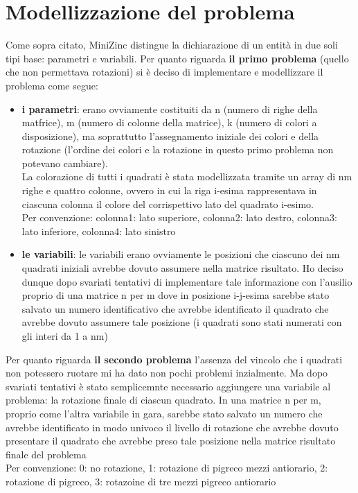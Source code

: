 \documentclass{article}
\begin{document}
\section{Modellizzazione del problema}
Come sopra citato, MiniZinc distingue la dichiarazione di un entità in due soli tipi base: parametri e variabili.
Per quanto riguarda \textbf{il primo problema} (quello che non permettava rotazioni) si è deciso di implementare e modellizzare il problema come segue:
\begin{itemize}
\item \textbf{i parametri}: erano ovviamente costituiti da n (numero di righe della matfrice), m (numero di colonne della matrice), k (numero di colori a disposizione), ma soprattutto l'assegnamento iniziale dei colori e della rotazione (l'ordine dei colori e la rotazione in questo primo problema non potevano cambiare).\\
La colorazione di tutti i quadrati è stata modellizzata tramite un array di nm righe e quattro colonne, ovvero in cui la riga i-esima rappresentava in ciascuna colonna il colore del corrispettivo lato del quadrato i-esimo.\\
Per convenzione: colonna1: lato superiore, colonna2: lato destro, colonna3: lato inferiore, colonna4: lato sinistro
\item \textbf{le variabili}: le variabili erano ovviamente le posizioni che ciascuno dei nm quadrati iniziali avrebbe dovuto assumere nella matrice risultato. Ho deciso dunque dopo svariati tentativi di implementare tale informazione con l'ausilio proprio di una matrice n per m dove in posizione i-j-esima sarebbe stato salvato un numero identificativo che avrebbe identificato il quadrato che avrebbe dovuto assumere tale posizione (i quadrati sono stati numerati con gli interi da 1 a nm)
\end{itemize}
Per quanto riguarda \textbf{il secondo problema} l'assenza del vincolo che i quadrati non potessero ruotare mi ha dato non pochi problemi inzialmente. Ma dopo svariati tentativi è stato semplicemnte necessario aggiungere una variabile al problema: la rotazione finale di ciascun quadrato. In una matrice n per m, proprio come l'altra variabile in gara, sarebbe stato salvato un numero che avrebbe identificato in modo univoco il livello di rotazione che avrebbe dovuto presentare il quadrato che avrebbe preso tale posizione nella matrice risultato finale del problema\\
Per convenzione: 0: no rotazione, 1: rotazione di pigreco mezzi antiorario, 2: rotazione di pigreco, 3: rotazoine di tre mezzi pigreco antiorario
\end{document}
